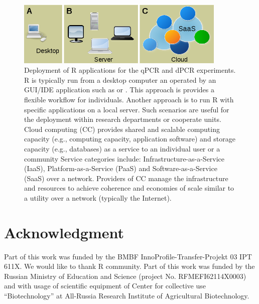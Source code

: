 \begin{figure}[htbp]
  \centering
  \includegraphics[clip=true, width=10cm]{figures/options.png}
  \caption{Deployment of R applications for the qPCR and dPCR experiments. 
 R is typically run from a desktop computer an operated by an 
GUI/IDE application such as  or . This approach is 
provides a flexible workflow for individuals.  Another approach is 
to run R with specific applications on a local server. Such scenarios are useful 
for the deployment within research departments or cooperate units.  
Cloud computing (CC) provides shared and scalable computing capacity (e.g., 
computing capacity, application software) and storage capacity (e.g., databases) 
as a service to an individual user or a community Service categories include: 
Infrastructure-as-a-Service (IaaS), Platform-as-a-Service (PaaS) and 
Software-as-a-Service (SaaS) over a network. Providers of CC manage the 
infrastructure and resources to achieve coherence and economies of scale similar 
to a utility over a network (typically the Internet).}
  \label{figure:options}
\end{figure} 

\section{Acknowledgment}

Part of this work was funded by the BMBF InnoProfile-Transfer-Projekt 03 IPT 
611X. We would like to thank R community. Part of this work was funded by the Russian Ministry of 
Education and Science (project No. RFMEFI62114X0003) and with usage of scientific equipment of 
Center for collective use ``Biotechnology'' at All-Russia Research Institute of Agricultural Biotechnology.



\address{Stefan R\"odiger (corresponding author)\\
  Faculty of Natural Sciences\\
  Brandenburg University of Technology Cottbus--Senftenberg\\
  Senftenberg\\
  Germany}

